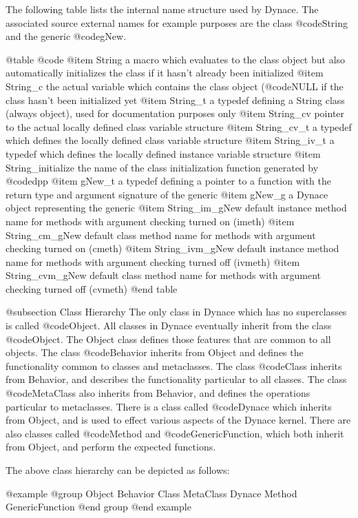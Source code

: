 The following table lists the internal name structure used by Dynace.
The associated source external names for example purposes are the class
@code{String} and the generic @code{gNew}.

@table @code
@item String
a macro which evaluates to the class object but also automatically
initializes the class if it hasn't already been initialized
@item String_c
the actual variable which contains the class object (@code{NULL} if the
class hasn't been initialized yet
@item String_t
a typedef defining a String class (always object), used for documentation
purposes only
@item String_cv
pointer to the actual locally defined class variable structure
@item String_cv_t
a typedef which defines the locally defined class variable structure
@item String_iv_t
a typedef which defines the locally defined instance variable structure
@item String_initialize
the name of the class initialization function generated by @code{dpp}
@item gNew_t
a typedef defining a pointer to a function with the return type and argument
signature of the generic
@item gNew_g
a Dynace object representing the generic
@item String_im_gNew
default instance method name for methods with argument checking turned on
(imeth)
@item String_cm_gNew
default class method name for methods with argument checking turned on
(cmeth)
@item String_ivm_gNew
default instance method name for methods with argument checking turned off
(ivmeth)
@item String_cvm_gNew
default class method name for methods with argument checking turned off
(cvmeth)
@end table


@subsection Class Hierarchy
The only class in Dynace which has no superclasses is called
@code{Object}.  All classes in Dynace eventually inherit from the class
@code{Object}.  The Object class defines those features that are common
to all objects.  The class @code{Behavior} inherits from Object and
defines the functionality common to classes and metaclasses.  The class
@code{Class} inherits from Behavior, and describes the functionality
particular to all classes.  The class @code{MetaClass} also inherits
from Behavior, and defines the operations particular to metaclasses.
There is a class called @code{Dynace} which inherits from Object, and is
used to effect various aspects of the Dynace kernel.  There are also
classes called @code{Method} and @code{GenericFunction}, which both inherit
from Object, and perform the expected functions.

The above class hierarchy can be depicted as follows:

@example
@group
     Object
          Behavior
               Class
               MetaClass
          Dynace
          Method
          GenericFunction
@end group
@end example

